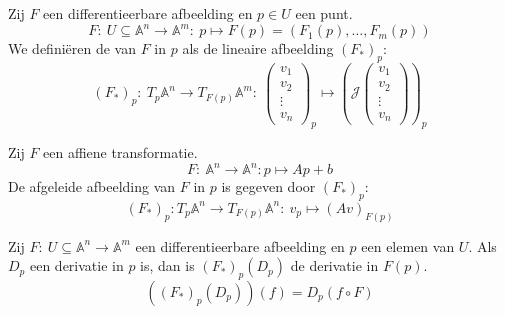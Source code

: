 \documentclass[main.tex]{subfiles}
\begin{document}
\begin{de}
  Zij $F$ een differentieerbare afbeelding en $p \in U$ een punt.
  \[ F:\ U\subseteq \mathbb{A}^{n} \rightarrow \mathbb{A}^{m}:\ p\mapsto F(p) = (F_{1}(p),\dotsc,F_{m}(p)) \]
  We defini\"eren de  van $F$ in $p$ als de lineaire afbeelding $(F_{*})_{p}$:
  \[
  (F_{*})_{p}:\ T_{p}\mathbb{A}^{n}\rightarrow T_{F(p)}\mathbb{A}^{m}:\
  \begin{pmatrix}
    v_{1}\\v_{2}\\\vdots\\v_{n}
  \end{pmatrix}_{p}
  \mapsto
  \left(
  \mathcal{J}
  \begin{pmatrix}
    v_{1}\\v_{2}\\\vdots\\v_{n}
  \end{pmatrix}
  \right)_{p} 
  \]
\end{de}

\begin{lem}
  Zij $F$ een affiene transformatie.
  \[ F:\ \mathbb{A}^{n} \rightarrow \mathbb{A}^{n}: p\mapsto Ap + b \]
  De afgeleide afbeelding van $F$ in $p$ is gegeven door $(F_{*})_{p}$:
  \[ (F_{*})_{p}: T_{p}\mathbb{A}^{n} \rightarrow T_{F(p)}\mathbb{A}^{n}:\ v_{p} \mapsto (Av)_{F(p)} \]
  \TODO{bewijs p 68}
\end{lem}

\begin{st}
  Zij $F:\ U\subseteq \mathbb{A}^{n} \rightarrow \mathbb{A}^{m}$ een differentieerbare afbeelding en $p$ een elemen van $U$.
  Als $D_{p}$ een derivatie in $p$ is, dan is $(F_{*})_{p}(D_{p})$ de derivatie in $F(p)$.
  \[ \left( (F_{*})_{p}(D_{p})\right) (f) = D_{p} (f\circ F) \]
\end{st}
\end{document}
